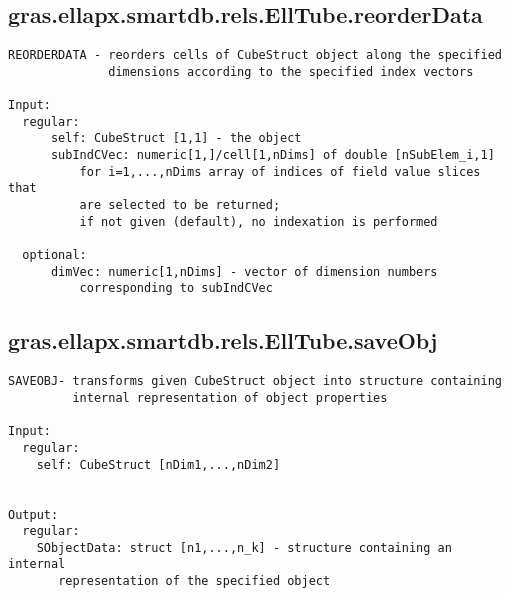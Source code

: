 \subsection{\texorpdfstring{gras.ellapx.smartdb.rels.EllTube.reorderData}{reorderData}}\label{method:gras.ellapx.smartdb.rels.EllTube.reorderData}
\begin{verbatim}
REORDERDATA - reorders cells of CubeStruct object along the specified
              dimensions according to the specified index vectors

Input:
  regular:
      self: CubeStruct [1,1] - the object
      subIndCVec: numeric[1,]/cell[1,nDims] of double [nSubElem_i,1]
          for i=1,...,nDims array of indices of field value slices that
          are selected to be returned;
          if not given (default), no indexation is performed

  optional:
      dimVec: numeric[1,nDims] - vector of dimension numbers
          corresponding to subIndCVec
\end{verbatim}
\subsection{\texorpdfstring{gras.ellapx.smartdb.rels.EllTube.saveObj}{saveObj}}\label{method:gras.ellapx.smartdb.rels.EllTube.saveObj}
\begin{verbatim}
SAVEOBJ- transforms given CubeStruct object into structure containing
         internal representation of object properties

Input:
  regular:
    self: CubeStruct [nDim1,...,nDim2]


Output:
  regular:
    SObjectData: struct [n1,...,n_k] - structure containing an internal
       representation of the specified object
\end{verbatim}
